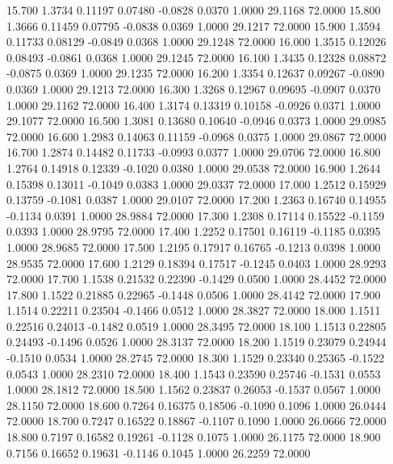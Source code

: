   15.700   1.3734   0.11197   0.07480  -0.0828   0.0370   1.0000  29.1168  72.0000
  15.800   1.3666   0.11459   0.07795  -0.0838   0.0369   1.0000  29.1217  72.0000
  15.900   1.3594   0.11733   0.08129  -0.0849   0.0368   1.0000  29.1248  72.0000
  16.000   1.3515   0.12026   0.08493  -0.0861   0.0368   1.0000  29.1245  72.0000
  16.100   1.3435   0.12328   0.08872  -0.0875   0.0369   1.0000  29.1235  72.0000
  16.200   1.3354   0.12637   0.09267  -0.0890   0.0369   1.0000  29.1213  72.0000
  16.300   1.3268   0.12967   0.09695  -0.0907   0.0370   1.0000  29.1162  72.0000
  16.400   1.3174   0.13319   0.10158  -0.0926   0.0371   1.0000  29.1077  72.0000
  16.500   1.3081   0.13680   0.10640  -0.0946   0.0373   1.0000  29.0985  72.0000
  16.600   1.2983   0.14063   0.11159  -0.0968   0.0375   1.0000  29.0867  72.0000
  16.700   1.2874   0.14482   0.11733  -0.0993   0.0377   1.0000  29.0706  72.0000
  16.800   1.2764   0.14918   0.12339  -0.1020   0.0380   1.0000  29.0538  72.0000
  16.900   1.2644   0.15398   0.13011  -0.1049   0.0383   1.0000  29.0337  72.0000
  17.000   1.2512   0.15929   0.13759  -0.1081   0.0387   1.0000  29.0107  72.0000
  17.200   1.2363   0.16740   0.14955  -0.1134   0.0391   1.0000  28.9884  72.0000
  17.300   1.2308   0.17114   0.15522  -0.1159   0.0393   1.0000  28.9795  72.0000
  17.400   1.2252   0.17501   0.16119  -0.1185   0.0395   1.0000  28.9685  72.0000
  17.500   1.2195   0.17917   0.16765  -0.1213   0.0398   1.0000  28.9535  72.0000
  17.600   1.2129   0.18394   0.17517  -0.1245   0.0403   1.0000  28.9293  72.0000
  17.700   1.1538   0.21532   0.22390  -0.1429   0.0500   1.0000  28.4452  72.0000
  17.800   1.1522   0.21885   0.22965  -0.1448   0.0506   1.0000  28.4142  72.0000
  17.900   1.1514   0.22211   0.23504  -0.1466   0.0512   1.0000  28.3827  72.0000
  18.000   1.1511   0.22516   0.24013  -0.1482   0.0519   1.0000  28.3495  72.0000
  18.100   1.1513   0.22805   0.24493  -0.1496   0.0526   1.0000  28.3137  72.0000
  18.200   1.1519   0.23079   0.24944  -0.1510   0.0534   1.0000  28.2745  72.0000
  18.300   1.1529   0.23340   0.25365  -0.1522   0.0543   1.0000  28.2310  72.0000
  18.400   1.1543   0.23590   0.25746  -0.1531   0.0553   1.0000  28.1812  72.0000
  18.500   1.1562   0.23837   0.26053  -0.1537   0.0567   1.0000  28.1150  72.0000
  18.600   0.7264   0.16375   0.18506  -0.1090   0.1096   1.0000  26.0444  72.0000
  18.700   0.7247   0.16522   0.18867  -0.1107   0.1090   1.0000  26.0666  72.0000
  18.800   0.7197   0.16582   0.19261  -0.1128   0.1075   1.0000  26.1175  72.0000
  18.900   0.7156   0.16652   0.19631  -0.1146   0.1045   1.0000  26.2259  72.0000
